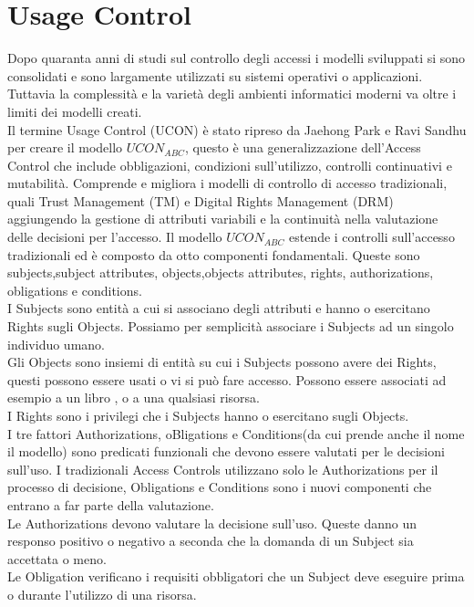 \section{Usage Control}
\label{sec:Usage Control}
Dopo quaranta anni di studi sul controllo degli accessi i modelli sviluppati si sono consolidati e sono largamente utilizzati
su sistemi operativi o applicazioni. Tuttavia la complessità e la varietà degli ambienti informatici moderni va oltre i limiti
dei modelli creati.\\
Il termine Usage Control (UCON) è stato ripreso da Jaehong Park e Ravi Sandhu per creare il modello $UCON_{ABC}$\cite{ucon},
questo è una generalizzazione dell'Access Control che include obbligazioni, condizioni sull'utilizzo,
controlli continuativi e mutabilità. Comprende e migliora i modelli di controllo di accesso tradizionali, quali Trust
Management (TM) e Digital Rights Management (DRM) aggiungendo la gestione di attributi variabili e la continuità nella valutazione
delle decisioni per l'accesso. Il modello $UCON_{ABC}$ estende i controlli sull'accesso tradizionali ed è composto da otto componenti fondamentali.
Queste sono subjects,subject attributes, objects,objects attributes, rights, authorizations, obligations e conditions.\\
I Subjects sono entità a cui si associano degli attributi e hanno o esercitano Rights sugli Objects. Possiamo per semplicità
associare i Subjects ad un singolo individuo umano.\\
Gli Objects sono insiemi di entità su cui i Subjects possono avere dei Rights, questi possono essere usati o vi si può
fare accesso. Possono essere associati ad esempio a un libro , o a una qualsiasi risorsa.\\
I Rights sono i privilegi che i Subjects hanno o esercitano sugli Objects.\\
I tre fattori Authorizations, oBligations e Conditions(da cui prende anche il
nome il modello) sono predicati funzionali che devono essere valutati per le decisioni sull'uso.
I tradizionali Access Controls utilizzano solo le Authorizations per il processo di decisione, Obligations e Conditions
sono i nuovi componenti che entrano a far parte della valutazione.\\
Le Authorizations devono valutare la decisione sull'uso. Queste danno un responso positivo
o negativo a seconda che la domanda di un Subject sia accettata o meno.\\
Le Obligation verificano i requisiti obbligatori che un Subject deve eseguire prima o durante l'utilizzo di una risorsa.\\
